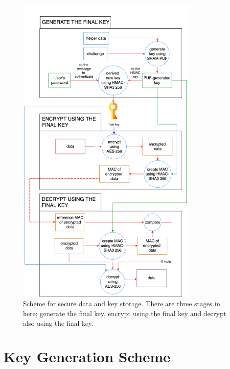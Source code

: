\begin{figure}[tph!]
    \centerline{\includegraphics[width={0.8\textwidth}]{images/proposed}}
    \caption{Scheme for secure data and key storage. There are three stages in here; generate the final key, encrypt using the final key and decrypt also using the final key.}
    \label{fig:scheme-data-protection}
\end{figure}

\section{Key Generation Scheme}\label{ch:key_generation_scheme}


